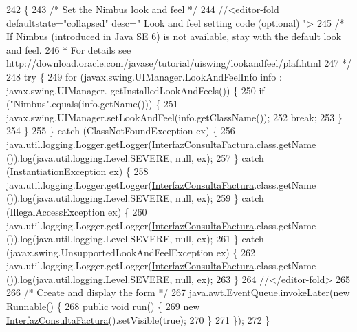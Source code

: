 \begin{DoxyCode}
242                                            \{
243         \textcolor{comment}{/* Set the Nimbus look and feel */}
244         \textcolor{comment}{//<editor-fold defaultstate="collapsed" desc=" Look and feel setting code (optional) ">}
245         \textcolor{comment}{/* If Nimbus (introduced in Java SE 6) is not available, stay with the default look and feel.}
246 \textcolor{comment}{         * For details see http://download.oracle.com/javase/tutorial/uiswing/lookandfeel/plaf.html }
247 \textcolor{comment}{         */}
248         \textcolor{keywordflow}{try} \{
249             \textcolor{keywordflow}{for} (javax.swing.UIManager.LookAndFeelInfo info : javax.swing.UIManager.
      getInstalledLookAndFeels()) \{
250                 \textcolor{keywordflow}{if} (\textcolor{stringliteral}{"Nimbus"}.equals(info.getName())) \{
251                     javax.swing.UIManager.setLookAndFeel(info.getClassName());
252                     \textcolor{keywordflow}{break};
253                 \}
254             \}
255         \} \textcolor{keywordflow}{catch} (ClassNotFoundException ex) \{
256             java.util.logging.Logger.getLogger(\mbox{\hyperlink{class_interfaz_package_1_1_interfaz_consulta_factura_ad3cdbc84d55cc6a8f2c75f7f0541b4e3}{InterfazConsultaFactura}}.class.getName
      ()).log(java.util.logging.Level.SEVERE, null, ex);
257         \} \textcolor{keywordflow}{catch} (InstantiationException ex) \{
258             java.util.logging.Logger.getLogger(\mbox{\hyperlink{class_interfaz_package_1_1_interfaz_consulta_factura_ad3cdbc84d55cc6a8f2c75f7f0541b4e3}{InterfazConsultaFactura}}.class.getName
      ()).log(java.util.logging.Level.SEVERE, null, ex);
259         \} \textcolor{keywordflow}{catch} (IllegalAccessException ex) \{
260             java.util.logging.Logger.getLogger(\mbox{\hyperlink{class_interfaz_package_1_1_interfaz_consulta_factura_ad3cdbc84d55cc6a8f2c75f7f0541b4e3}{InterfazConsultaFactura}}.class.getName
      ()).log(java.util.logging.Level.SEVERE, null, ex);
261         \} \textcolor{keywordflow}{catch} (javax.swing.UnsupportedLookAndFeelException ex) \{
262             java.util.logging.Logger.getLogger(\mbox{\hyperlink{class_interfaz_package_1_1_interfaz_consulta_factura_ad3cdbc84d55cc6a8f2c75f7f0541b4e3}{InterfazConsultaFactura}}.class.getName
      ()).log(java.util.logging.Level.SEVERE, null, ex);
263         \}
264         \textcolor{comment}{//</editor-fold>}
265 
266         \textcolor{comment}{/* Create and display the form */}
267         java.awt.EventQueue.invokeLater(\textcolor{keyword}{new} Runnable() \{
268             \textcolor{keyword}{public} \textcolor{keywordtype}{void} run() \{
269                 \textcolor{keyword}{new} \mbox{\hyperlink{class_interfaz_package_1_1_interfaz_consulta_factura_ad3cdbc84d55cc6a8f2c75f7f0541b4e3}{InterfazConsultaFactura}}().setVisible(\textcolor{keyword}{true});
270             \}
271         \});
272     \}
\end{DoxyCode}


